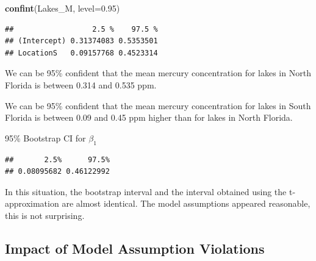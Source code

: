 \documentclass[]{book}
\newenvironment{Shaded}{\begin{snugshade}}{\end{snugshade}}
\newcommand{\KeywordTok}[1]{\textcolor[rgb]{0.13,0.29,0.53}{\textbf{#1}}}
\newcommand{\DataTypeTok}[1]{\textcolor[rgb]{0.13,0.29,0.53}{#1}}
\newcommand{\FloatTok}[1]{\textcolor[rgb]{0.00,0.00,0.81}{#1}}
\newcommand{\NormalTok}[1]{#1}
\begin{document}
\begin{Shaded}
\begin{Highlighting}[]
\KeywordTok{confint}\NormalTok{(Lakes_M, }\DataTypeTok{level=}\FloatTok{0.95}\NormalTok{)}
\end{Highlighting}
\end{Shaded}

\begin{verbatim}
##                  2.5 %    97.5 %
## (Intercept) 0.31374083 0.5353501
## LocationS   0.09157768 0.4523314
\end{verbatim}

We can be 95\% confident that the mean mercury concentration for lakes
in North Florida is between 0.314 and 0.535 ppm.

We can be 95\% confident that the mean mercury concentration for lakes
in South Florida is between 0.09 and 0.45 ppm higher than for lakes in
North Florida.

95\% Bootstrap CI for \(\beta_1\)

\begin{verbatim}
##       2.5%      97.5% 
## 0.08095682 0.46122992
\end{verbatim}

In this situation, the bootstrap interval and the interval obtained
using the t-approximation are almost identical. The model assumptions
appeared reasonable, this is not surprising.

\subsection{Impact of Model Assumption
Violations}\label{impact-of-model-assumption-violations}
\end{document}
